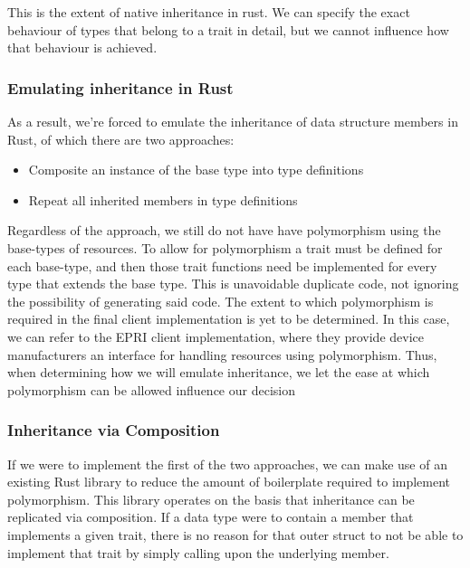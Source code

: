 This is the extent of native inheritance in rust. We can specify the exact behaviour of types that belong to a trait in detail, but we cannot influence how that behaviour is achieved.

\subsubsection{Emulating inheritance in Rust}

As a result, we're forced to emulate the inheritance of data structure members in Rust, of which there are two approaches:

\begin{itemize}
    \item Composite an instance of the base type into type definitions 
    \item Repeat all inherited members in type definitions
\end{itemize}

Regardless of the approach, we still do not have have polymorphism using the base-types of resources.
To allow for polymorphism a trait must be defined for each base-type, and then those trait functions need be implemented for every type that extends the base type. 
This is unavoidable duplicate code, not ignoring the possibility of generating said code.
The extent to which polymorphism is required in the final client implementation is yet to be determined. In this case, we can refer to the EPRI client implementation, 
where they provide device manufacturers an interface for handling resources using polymorphism.
Thus, when determining how we will emulate inheritance, we let the ease at which polymorphism can be allowed influence our decision


\subsubsection{Inheritance via Composition}

If we were to implement the first of the two approaches, we can make use of an existing Rust library to reduce the amount of boilerplate required to implement polymorphism.
This library operates on the basis that inheritance can be replicated via composition. If a data type were to contain a member that implements a given trait, there is no reason for that outer struct to not be able to implement that trait by simply calling upon the underlying member.



